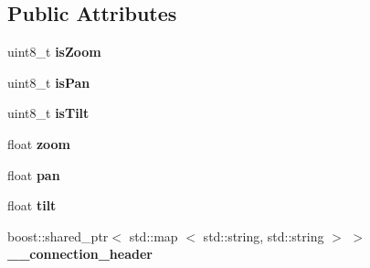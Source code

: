 \subsection*{\-Public \-Attributes}
\begin{DoxyCompactItemize}
\item 
\hypertarget{struct_c_i_t_i_u_s___control___communication_1_1msg__ctrl_rear_camera___a34063a859119c1111ba12a4cf6e0aa51}{uint8\-\_\-t {\bfseries is\-Zoom}}\label{struct_c_i_t_i_u_s___control___communication_1_1msg__ctrl_rear_camera___a34063a859119c1111ba12a4cf6e0aa51}

\item 
\hypertarget{struct_c_i_t_i_u_s___control___communication_1_1msg__ctrl_rear_camera___aa09cccf9f108361ee3854662f5ead6ba}{uint8\-\_\-t {\bfseries is\-Pan}}\label{struct_c_i_t_i_u_s___control___communication_1_1msg__ctrl_rear_camera___aa09cccf9f108361ee3854662f5ead6ba}

\item 
\hypertarget{struct_c_i_t_i_u_s___control___communication_1_1msg__ctrl_rear_camera___a154012d02f66d08adaaf103f2e92e668}{uint8\-\_\-t {\bfseries is\-Tilt}}\label{struct_c_i_t_i_u_s___control___communication_1_1msg__ctrl_rear_camera___a154012d02f66d08adaaf103f2e92e668}

\item 
\hypertarget{struct_c_i_t_i_u_s___control___communication_1_1msg__ctrl_rear_camera___ac802e6f249976e55178e59d2abba380c}{float {\bfseries zoom}}\label{struct_c_i_t_i_u_s___control___communication_1_1msg__ctrl_rear_camera___ac802e6f249976e55178e59d2abba380c}

\item 
\hypertarget{struct_c_i_t_i_u_s___control___communication_1_1msg__ctrl_rear_camera___a8f58d2d339ece2ef51b7707ec4bc149f}{float {\bfseries pan}}\label{struct_c_i_t_i_u_s___control___communication_1_1msg__ctrl_rear_camera___a8f58d2d339ece2ef51b7707ec4bc149f}

\item 
\hypertarget{struct_c_i_t_i_u_s___control___communication_1_1msg__ctrl_rear_camera___a9483e5c3e62428812752afa21c38b037}{float {\bfseries tilt}}\label{struct_c_i_t_i_u_s___control___communication_1_1msg__ctrl_rear_camera___a9483e5c3e62428812752afa21c38b037}

\item 
\hypertarget{struct_c_i_t_i_u_s___control___communication_1_1msg__ctrl_rear_camera___aadda38f60d546989b315c259cf8e8226}{boost\-::shared\-\_\-ptr$<$ std\-::map\*
$<$ std\-::string, std\-::string $>$ $>$ {\bfseries \-\_\-\-\_\-connection\-\_\-header}}\label{struct_c_i_t_i_u_s___control___communication_1_1msg__ctrl_rear_camera___aadda38f60d546989b315c259cf8e8226}

\end{DoxyCompactItemize}

